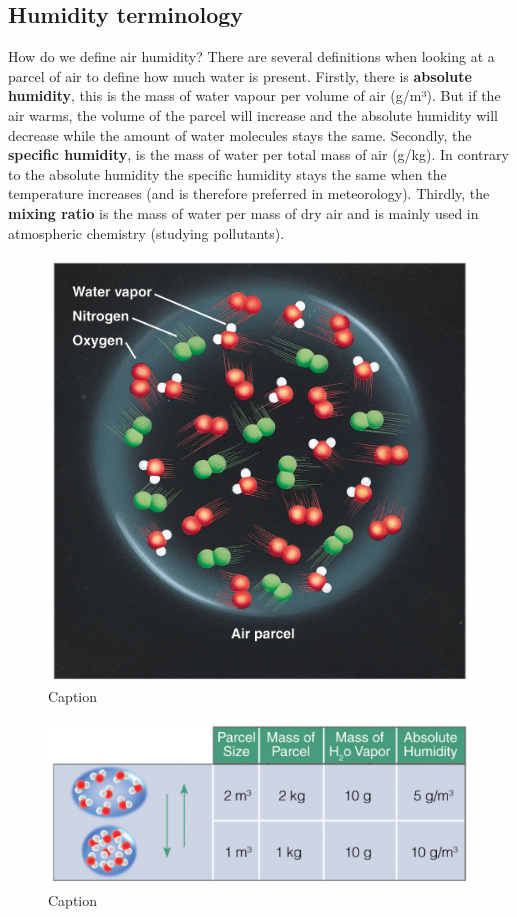 \documentclass[12pt,oneside]{book}
\begin{document}
\subsection{Humidity terminology}\label{humidity-terminology}

How do we define air humidity? There are several definitions when
looking at a parcel of air to define how much water is present. Firstly,
there is \textbf{absolute humidity}, this is the mass of water vapour
per volume of air (g/m³). But if the air warms, the volume of the parcel
will increase and the absolute humidity will decrease while the amount
of water molecules stays the same. Secondly, the \textbf{specific
humidity}, is the mass of water per total mass of air (g/kg). In
contrary to the absolute humidity the specific humidity stays the same
when the temperature increases (and is therefore preferred in
meteorology). Thirdly, the \textbf{mixing ratio} is the mass of water
per mass of dry air and is mainly used in atmospheric chemistry
(studying pollutants).

\begin{figure}

{\centering \includegraphics[width=0.7\linewidth]{figures/Figure227} 

}

\caption{Caption}\label{fig:Humidityterm}
\end{figure}

\begin{figure}

{\centering \includegraphics[width=1\linewidth]{figures/Figure228} 

}

\caption{Caption}\label{fig:Humidityterm2}
\end{figure}
\end{document}
